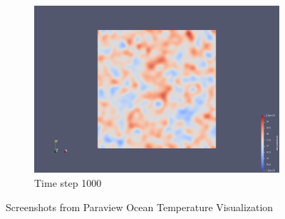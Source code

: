 \documentclass[a4paper,12pt]{article}
\begin{document}
\begin{figure}
\begin{subfigure}{0.4\textwidth}
    \includegraphics[width=\textwidth]{../images/vtk/bonus/temp/step_100.png}
    \caption{Time step 1000}
\end{subfigure}
        
\caption{Screenshots from Paraview Ocean Temperature Visualization}
\end{figure}
\end{document}

